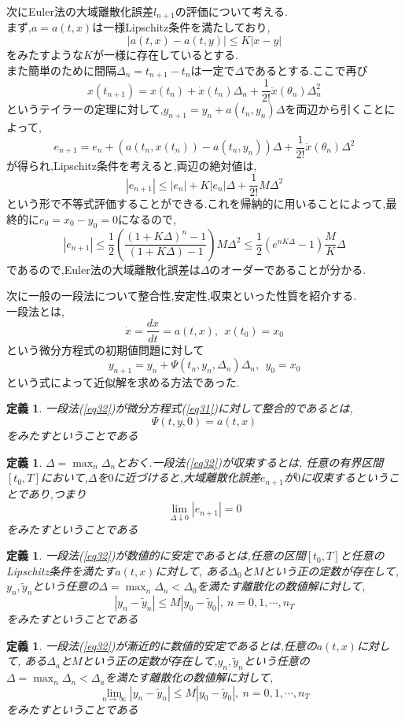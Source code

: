 \documentclass[a4paper]{jreport}
\numberwithin{equation}{section}
\newtheorem{Def}     [Thm]{定義}
\renewenvironment{leftbar}{%
  \def\FrameCommand{\vrule width 1pt \hspace{10pt}}%
  \MakeFramed {\advance\hsize-\width \FrameRestore}}%
 {\endMakeFramed}
\def\defb{\begin{leftbar}\begin{Def}}
\def\defx{\end{Def}\end{leftbar}}
\def\eq{\begin{equation}}
\def\eqx{\end{equation}}
\begin{document}
次にEuler法の大域離散化誤差$l_{n+1}$の評価について考える.\\
まず,$a=a(t,x)$は一様Lipschitz条件を満たしており,
\[
|a(t,x) - a(t,y)| \le K |x-y|
\]
をみたすような$K$が一様に存在しているとする.\\
また簡単のために間隔$\Delta_n = t_{n+1} -t_n$は一定で$\Delta$であるとする.ここで再び
\[
x(t_{n+1}) = x(t_n) + \dot{x}(t_n)\Delta_n + \frac{1}{2!} \ddot{x}(\theta_n)\Delta_n^2
\]
というテイラーの定理に対して,$y_{n+1} = y_n + a(t_n,y_n)\Delta $を両辺から引くことによって,
\[
e_{n+1} = e_n + (a(t_n,x(t_n))-a(t_n,y_n))\Delta + \frac{1}{2!} \ddot{x}(\theta_n)\Delta^2
\]
が得られ,Lipschitz条件を考えると,両辺の絶対値は,
\[
|e_{n+1}| \le |e_n| + K|e_n|\Delta + \frac{1}{2!} M\Delta^2
\]
という形で不等式評価することができる.これを帰納的に用いることによって,最終的に$e_0 = x_0 - y_0 = 0$になるので,
\[
|e_{n+1}| \le \frac{1}{2} \left( \frac{(1+K\Delta)^n -1 }{(1+K\Delta)-1} \right)M\Delta^2 \le
\frac{1}{2} (e^{nK\Delta} -1) \frac{M}{K}\Delta
\]
であるので,Euler法の大域離散化誤差は$\Delta$のオーダーであることが分かる.\par
次に一般の一段法について整合性,安定性,収束といった性質を紹介する.\\
一段法とは,
\eq
\label{eq31}
\dot{x} = \frac{dx}{dt} = a(t,x), \  \  x(t_0) = x_0
\eqx
という微分方程式の初期値問題に対して
\eq
\label{eq32}
y_{n+1} = y_n + \Psi(t_n,y_n,\Delta_n) \Delta_n,\  \  y_0 = x_0
\eqx
という式によって近似解を求める方法であった.\\
\defb
一段法(\ref{eq32})が微分方程式(\ref{eq31})に対して整合的であるとは,\\
\[
\Psi(t,y,0)  = a(t,x)
\]
をみたすということである
\defx

\defb
$\Delta =\max_n \Delta_n$とおく.一段法(\ref{eq32})が収束するとは,
任意の有界区間$[t_0,T]$において,$\Delta$を$0$に近づけると,大域離散化誤差$e_{n+1}$が$0$に収束するということであり,つまり\\
\[
\lim_{\Delta \downarrow 0} |e_{n+1}| = 0
\]
をみたすということである
\defx

\defb
一段法(\ref{eq32})が数値的に安定であるとは,任意の区間$[t_0,T]$と任意のLipschitz条件を満たす$a(t,x)$に対して,
ある$\Delta_0$と$M$という正の定数が存在して,$y_n,\tilde{y}_n$という任意の$\Delta =\max_n \Delta_n < \Delta_0$を満たす離散化の数値解に対して,
\[
|y_n - \tilde{y}_n | \le M |y_0 - \tilde{y}_0| ,\ n = 0,1,\cdots,n_T
\]
をみたすということである
\defx

\defb
一段法(\ref{eq32})が漸近的に数値的安定であるとは,任意の$a(t,x)$に対して,
ある$\Delta_a$と$M$という正の定数が存在して,$y_n,\tilde{y}_n$という任意の$\Delta =\max_n \Delta_n < \Delta_a$を満たす離散化の数値解に対して,
\[
\lim_{n\to\infty}|y_n - \tilde{y}_n | \le M |y_0 - \tilde{y}_0| ,\ n = 0,1,\cdots,n_T
\]
をみたすということである
\defx
\end{document}
